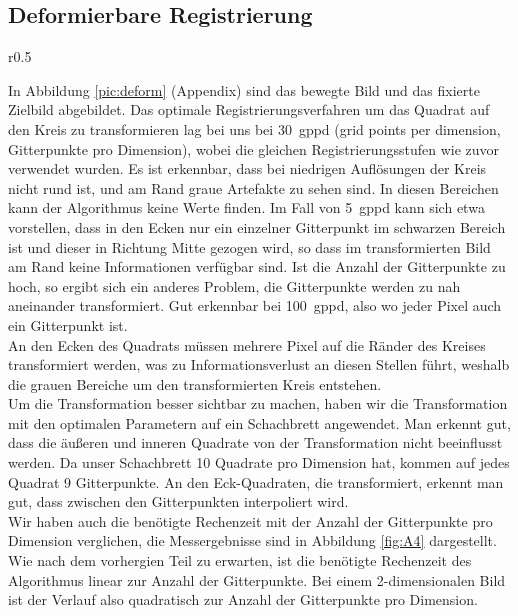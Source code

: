 \subsection{Deformierbare Registrierung}
\begin{wrapfigure}{r}{0.5\linewidth}
  \vspace{-10pt}
  \caption{}
  \label{fig:A4}
  \vspace{-10pt}
  \resizebox{\linewidth}{!}{}
  \vspace{-30pt}
\end{wrapfigure}
In Abbildung \ref{pic:deform} (Appendix) sind das bewegte Bild und das fixierte
Zielbild abgebildet. Das optimale Registrierungsverfahren um das Quadrat auf
den Kreis zu transformieren lag bei uns bei \SI{30}{gppd} (grid points per
dimension, Gitterpunkte pro Dimension), wobei die gleichen Registrierungsstufen
wie zuvor verwendet wurden. Es ist erkennbar, dass bei niedrigen Auflösungen
der Kreis nicht rund ist, und am Rand graue Artefakte zu sehen sind. In diesen
Bereichen kann der Algorithmus keine Werte finden. Im Fall von \SI{5}{gppd}
kann sich etwa vorstellen, dass in den Ecken nur ein einzelner Gitterpunkt im
schwarzen Bereich ist und dieser in Richtung Mitte gezogen wird, so dass im
transformierten Bild am Rand keine Informationen verfügbar sind. Ist die Anzahl
der Gitterpunkte zu hoch, so ergibt sich ein anderes Problem, die Gitterpunkte
werden zu nah aneinander transformiert. Gut erkennbar bei \SI{100}{gppd}, also
wo jeder Pixel auch ein Gitterpunkt ist.\\
An den Ecken des Quadrats müssen mehrere Pixel auf die Ränder des Kreises
transformiert werden, was zu Informationsverlust an diesen Stellen führt,
weshalb die grauen Bereiche um den transformierten Kreis entstehen.\\
Um die Transformation besser sichtbar zu machen, haben wir die Transformation
mit den optimalen Parametern auf ein Schachbrett angewendet. Man erkennt gut,
dass die äußeren und inneren Quadrate von der Transformation nicht beeinflusst
werden. Da unser Schachbrett \num{10} Quadrate pro Dimension hat, kommen auf
jedes Quadrat \num{9} Gitterpunkte. An den Eck-Quadraten, die transformiert,
erkennt man gut, dass zwischen den Gitterpunkten interpoliert wird.\\
Wir haben auch die benötigte Rechenzeit mit der Anzahl der Gitterpunkte pro
Dimension verglichen, die Messergebnisse sind in Abbildung \ref{fig:A4}
dargestellt. Wie nach dem vorhergien Teil zu erwarten, ist die benötigte
Rechenzeit des Algorithmus linear zur Anzahl der Gitterpunkte. Bei einem
2-dimensionalen Bild ist der Verlauf also quadratisch zur Anzahl der
Gitterpunkte pro Dimension.

